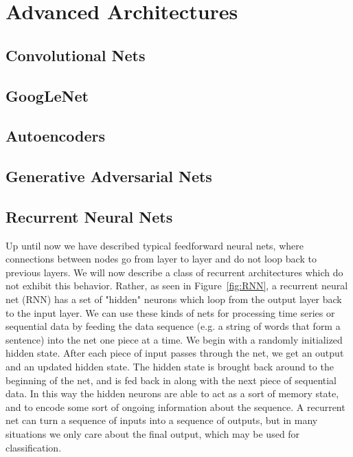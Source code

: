 \chapter{Advanced Architectures}\label{sec:advanced_architectures}

\section{Convolutional Nets}

\section{GoogLeNet}

\section{Autoencoders}

\section{Generative Adversarial Nets}

\section{Recurrent Neural Nets}

Up until now we have described typical feedforward neural nets, where connections between nodes go from layer to layer and do not loop back to previous layers. We will now describe a class of recurrent architectures which do not exhibit this behavior. Rather, as seen in Figure~\ref{fig:RNN}, a recurrent neural net (RNN) has a set of "hidden" neurons which loop from the output layer back to the input layer. We can use these kinds of nets for processing time series or sequential data by feeding the data sequence (e.g. a string of words that form a sentence) into the net one piece at a time. We begin with a randomly initialized hidden state. After each piece of input passes through the net, we get an output and an updated hidden state. The hidden state is brought back around to the beginning of the net, and is fed back in along with the next piece of sequential data. In this way the hidden neurons are able to act as a sort of memory state, and to encode some sort of ongoing information about the sequence. A recurrent net can turn a sequence of inputs into a sequence of outputs, but in many situations we only care about the final output, which may be used for classification.

